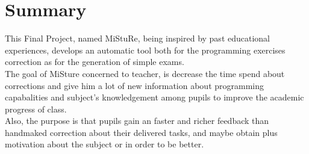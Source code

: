 

\chapter*{Summary}

This Final Project, named MiStuRe,  being inspired by past educational experiences, develops an automatic tool both for the programming exercises correction as for the generation of simple exams.\\


The goal of MiSture concerned to teacher, is decrease the time spend about corrections and give him a lot of new information about programming capabalities and subject's knowledgement among pupils to improve the academic progress of class.\\


Also, the purpose is that pupils gain an faster and richer feedback than handmaked correction about their delivered tasks, and maybe obtain plus motivation about the subject or in order to be better.\\

